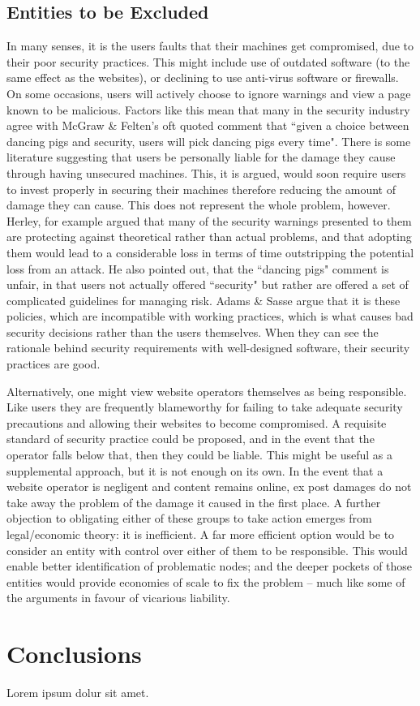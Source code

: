 \documentclass{acm_proc_article-sp}
\begin{document}
\subsection{Entities to be Excluded}
In many senses, it is the users faults that their machines get compromised, due to their poor security practices.  This might include use of outdated software (to the same effect as the websites), or declining to use anti-virus software or firewalls.  On some occasions, users will actively choose to ignore warnings and view a page known to be malicious.  Factors like this mean that many in the security industry agree with McGraw \& Felten's oft quoted comment that ``given a choice between dancing pigs and security, users will pick dancing pigs every time"\cite{akhawe2013}.  There is some literature suggesting that users be personally liable for the damage they cause through having unsecured machines\cite{deguzman}.  This, it is argued, would soon require users to invest properly in securing their machines therefore reducing the amount of damage they can cause.  This does not represent the whole problem, however.  Herley, for example argued that many of the security warnings presented to them are protecting against theoretical rather than actual problems, and that adopting them would lead to a considerable loss in terms of time outstripping the potential loss from an attack.  He also pointed out, that the ``dancing pigs" comment is unfair, in that users not actually offered ``security" but rather are offered a set of complicated guidelines for managing risk\cite{herley}.  Adams \& Sasse argue that it is these policies, which are incompatible with working practices, which is what causes bad security decisions rather than the users themselves.  When they can see the rationale behind security requirements with well-designed software, their security practices are good\cite{adamsSasse}.  

Alternatively, one might view website operators themselves as being responsible.  Like users they are frequently blameworthy for failing to take adequate security precautions and allowing their websites to become compromised.  A requisite standard of security practice could be proposed, and in the event that the operator falls below that, then they could be liable.  This might be useful as a supplemental approach, but it is not enough on its own.  In the event that a website operator is negligent and content remains online, ex post damages do not take away the problem of the damage it caused in the first place.  A further objection to obligating either of these groups to take action emerges from legal/economic theory: it is inefficient.  A far more efficient option would be to consider an entity with control over either of them to be responsible.  This would enable better identification of problematic nodes; and the deeper pockets of those entities would provide economies of scale to fix the problem -- much like some of the arguments in favour of vicarious liability\cite{atiyah}.

\section{Conclusions}
Lorem ipsum dolur sit amet.







\balancecolumns
\end{document}
